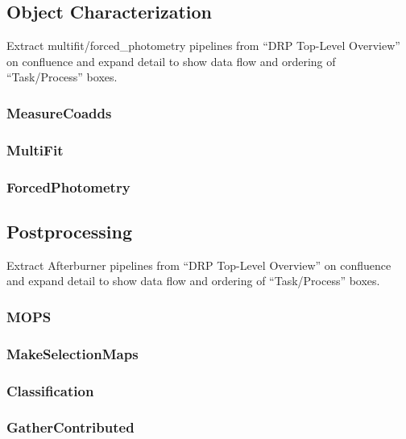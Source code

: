 \subsection{Object Characterization}
\label{sec:drp_object_characterization}

\begin{note}
Extract multifit/forced\_photometry pipelines from ``DRP Top-Level Overview'' on confluence and expand detail to show data flow and ordering of ``Task/Process'' boxes.
\end{note}

\subsubsection{MeasureCoadds}
\label{sec:drpMeasureCoadds}
\subsubsection{MultiFit}
\label{sec:drpMultiFit}
\subsubsection{ForcedPhotometry}
\label{sec:drpForcedPhotometry}

\subsection{Postprocessing}
\label{sec:drp_postprocessing}

\begin{note}
Extract Afterburner pipelines from ``DRP Top-Level Overview'' on confluence and expand detail to show data flow and ordering of ``Task/Process'' boxes.
\end{note}

\subsubsection{MOPS}
\label{sec:drpMOPS}
\subsubsection{MakeSelectionMaps}
\label{sec:drpMakeSelectionMaps}
\subsubsection{Classification}
\label{sec:drpClassification}
\subsubsection{GatherContributed}
\label{sec:drpGatherContributed}

